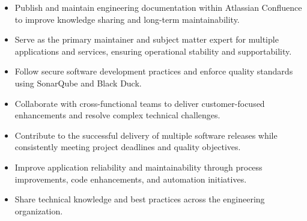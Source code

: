 \documentclass[letterpaper]{twentysecondcv} %
\begin{document}
\begin{itemize}
	\item Publish and maintain engineering documentation within Atlassian Confluence to improve knowledge sharing and long-term maintainability.
	\item Serve as the primary maintainer and subject matter expert for multiple applications and services, ensuring operational stability and supportability.
	\item Follow secure software development practices and enforce quality standards using SonarQube and Black Duck.
	\item Collaborate with cross-functional teams to deliver customer-focused enhancements and resolve complex technical challenges.
	\item Contribute to the successful delivery of multiple software releases while consistently meeting project deadlines and quality objectives.
	\item Improve application reliability and maintainability through process improvements, code enhancements, and automation initiatives.
	\item Share technical knowledge and best practices across the engineering organization.
\end{itemize}
\newpage
\end{document}
